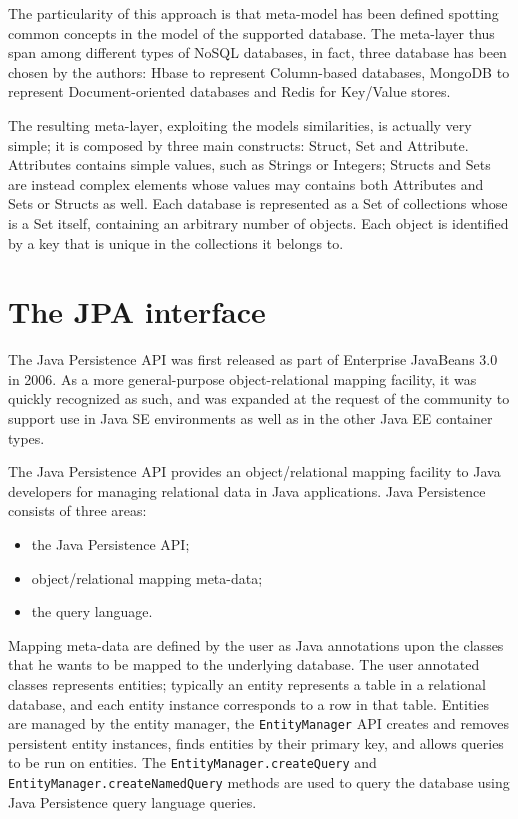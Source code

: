 \noindent The particularity of this approach is that meta-model has been defined spotting common concepts in the model of the supported database. The meta-layer thus span among different types of NoSQL databases, in fact, three database has been chosen by the authors: Hbase to represent Column-based databases, MongoDB to represent Document-oriented databases and Redis for Key/Value stores. 

\noindent The resulting meta-layer, exploiting the models similarities, is actually very simple; it is composed by three main constructs: Struct, Set and Attribute.
Attributes contains simple values, such as Strings or Integers; Structs and Sets are instead complex elements whose values may contains both Attributes and Sets or Structs as well.
Each database is represented as a Set of collections whose is a Set itself, containing an arbitrary number of objects. Each object is identified by a key that is unique in the collections it belongs to.

\section{The JPA interface}
\label{sec:jpa}
The Java Persistence API \cite{book:projpa2} was first released as part of Enterprise JavaBeans 3.0 in 2006. As a more general-purpose object-relational mapping facility, it was quickly recognized as such, and was expanded at the request of the community to support use in Java SE environments as well as in the other Java EE container types.

\newparagraph The Java Persistence API provides an object/relational mapping facility to Java developers for managing relational data in Java applications. Java Persistence consists of three areas:
\begin{itemize}
\item the Java Persistence API;
\item object/relational mapping meta-data;
\item the query language.
\end{itemize}

\noindent Mapping meta-data are defined by the user as Java annotations upon the classes that he wants to be mapped to the underlying database.
The user annotated classes represents entities; typically an entity represents a table in a relational database, and each entity instance corresponds to a row in that table. Entities are managed by the entity manager, the \texttt{EntityManager} API creates and removes persistent entity instances, finds entities by their primary key, and allows queries to be run on entities. 
The \texttt{EntityManager.createQuery} and \texttt{EntityManager.createNamedQuery} methods are used to query the database using Java Persistence query language queries. 

